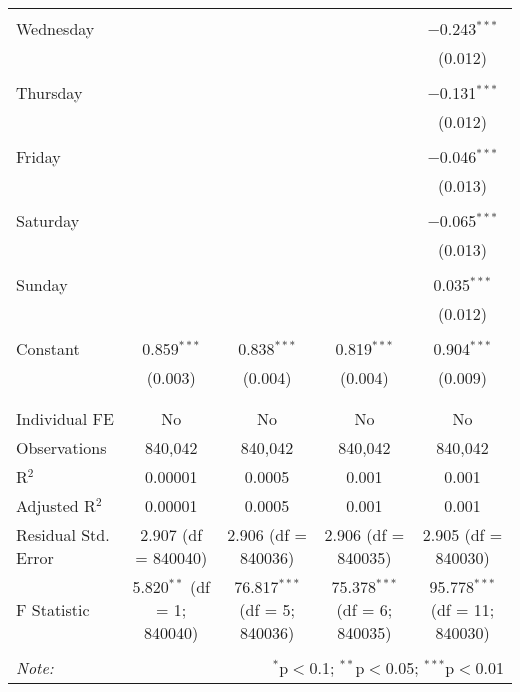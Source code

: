\documentclass[
]{article}
\begin{document}
\begin{table}[!htbp]
{\begin{tabular}{@{\extracolsep{5pt}}lcccc}
  & & & & \\ 
 Wednesday &  &  &  & $-$0.243$^{***}$ \\ 
  &  &  &  & (0.012) \\ 
  & & & & \\ 
 Thursday &  &  &  & $-$0.131$^{***}$ \\ 
  &  &  &  & (0.012) \\ 
  & & & & \\ 
 Friday &  &  &  & $-$0.046$^{***}$ \\ 
  &  &  &  & (0.013) \\ 
  & & & & \\ 
 Saturday &  &  &  & $-$0.065$^{***}$ \\ 
  &  &  &  & (0.013) \\ 
  & & & & \\ 
 Sunday &  &  &  & 0.035$^{***}$ \\ 
  &  &  &  & (0.012) \\ 
  & & & & \\ 
 Constant & 0.859$^{***}$ & 0.838$^{***}$ & 0.819$^{***}$ & 0.904$^{***}$ \\ 
  & (0.003) & (0.004) & (0.004) & (0.009) \\ 
  & & & & \\ 
\hline \\[-1.8ex] 
Individual FE & No & No & No & No \\ 
Observations & 840,042 & 840,042 & 840,042 & 840,042 \\ 
R$^{2}$ & 0.00001 & 0.0005 & 0.001 & 0.001 \\ 
Adjusted R$^{2}$ & 0.00001 & 0.0005 & 0.001 & 0.001 \\ 
Residual Std. Error & 2.907 (df = 840040) & 2.906 (df = 840036) & 2.906 (df = 840035) & 2.905 (df = 840030) \\ 
F Statistic & 5.820$^{**}$ (df = 1; 840040) & 76.817$^{***}$ (df = 5; 840036) & 75.378$^{***}$ (df = 6; 840035) & 95.778$^{***}$ (df = 11; 840030) \\ 
\hline 
\hline \\[-1.8ex] 
\textit{Note:}  & \multicolumn{4}{r}{$^{*}$p$<$0.1; $^{**}$p$<$0.05; $^{***}$p$<$0.01} \\ 
\end{tabular}
} 
\end{table} 
\newpage
\end{document}
